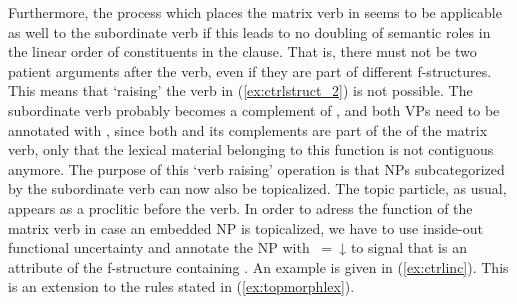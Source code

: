 Furthermore, the process which places the matrix verb in  seems to be
applicable as well to the subordinate verb if this leads to no doubling of
semantic roles in the linear order of constituents in the clause. That is,
there must not be two patient arguments after the verb, even if they are part
of different f-structures. This means that `raising' the verb in
(\ref{ex:ctrlstruct_2}) is not possible. The subordinate verb probably becomes
a complement of , and both VPs need to be annotated with
\pass{\XCompl}, since both  and its complements are part of the
\XCompl{} of the matrix verb, only that the lexical material belonging to this
function is not contiguous anymore. The purpose of this `verb raising'
operation is that NPs subcategorized by the subordinate verb can now also be
topicalized. The topic particle, as usual, appears as a proclitic before the
verb. In order to adress the \Top{} function of the matrix verb in case an
embedded NP is topicalized, we have to use inside-out functional uncertainty
and annotate the NP with \uncertain{\XCompl}{\Top}~=~↓ to signal that \Top{} is
an attribute of the f-structure containing \XCompl{}. An example is given in
(\ref{ex:ctrlinc}). This is an extension to the rules stated in 
(\ref{ex:topmorphlex}).

